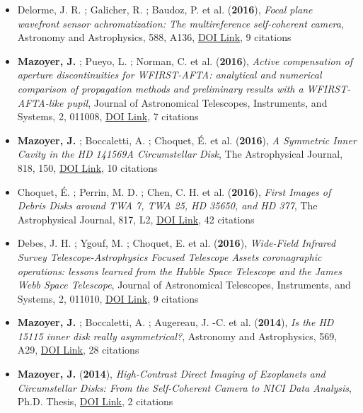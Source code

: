 \documentclass[11pt]{article}
\begin{document}
\begin{itemize}
\item Delorme, J. R. ; Galicher, R. ; Baudoz, P. et al. ({\bf2016}), {\it Focal plane wavefront sensor achromatization: The multireference self-coherent camera}, Astronomy and Astrophysics, 588, A136, \href{https://doi.org/10.1051/0004-6361/201527657}{DOI Link}, 9 citations

\item {\bf Mazoyer, J.} ; Pueyo, L. ; Norman, C. et al. ({\bf2016}), {\it Active compensation of aperture discontinuities for WFIRST-AFTA: analytical and numerical comparison of propagation methods and preliminary results with a WFIRST-AFTA-like pupil}, Journal of Astronomical Telescopes, Instruments, and Systems, 2, 011008, \href{https://doi.org/10.1117/1.JATIS.2.1.011008}{DOI Link}, 7 citations

\item {\bf Mazoyer, J.} ; Boccaletti, A. ; Choquet, {\'E}. et al. ({\bf2016}), {\it A Symmetric Inner Cavity in the HD 141569A Circumstellar Disk}, The Astrophysical Journal, 818, 150, \href{https://doi.org/10.3847/0004-637X/818/2/150}{DOI Link}, 10 citations

\item Choquet, {\'E}. ; Perrin, M. D. ; Chen, C. H. et al. ({\bf2016}), {\it First Images of Debris Disks around TWA 7, TWA 25, HD 35650, and HD 377}, The Astrophysical Journal, 817, L2, \href{https://doi.org/10.3847/2041-8205/817/1/L2}{DOI Link}, 42 citations

\item Debes, J. H. ; Ygouf, M. ; Choquet, E. et al. ({\bf2016}), {\it Wide-Field Infrared Survey Telescope-Astrophysics Focused Telescope Assets coronagraphic operations: lessons learned from the Hubble Space Telescope and the James Webb Space Telescope}, Journal of Astronomical Telescopes, Instruments, and Systems, 2, 011010, \href{https://doi.org/10.1117/1.JATIS.2.1.011010}{DOI Link}, 9 citations

\item {\bf Mazoyer, J.} ; Boccaletti, A. ; Augereau, J. -C. et al. ({\bf2014}), {\it Is the HD 15115 inner disk really asymmetrical?}, Astronomy and Astrophysics, 569, A29, \href{https://doi.org/10.1051/0004-6361/201424479}{DOI Link}, 28 citations

\item {\bf Mazoyer, J.} ({\bf2014}), {\it High-Contrast Direct Imaging of Exoplanets and Circumstellar Disks: From the Self-Coherent Camera to NICI Data Analysis}, Ph.D. Thesis, \href{https://doi.org/10.5281/zenodo.58003}{DOI Link}, 2 citations


\end{itemize}
\end{document}
